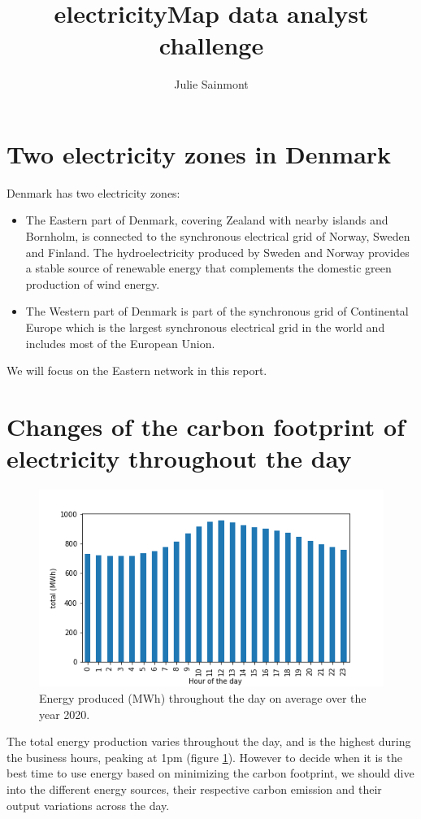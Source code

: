 \documentclass[11pt]{article} %
\title{electricityMap data analyst challenge}
\author{Julie Sainmont}
\begin{document}
\maketitle

\section{Two electricity zones in Denmark}

Denmark has two electricity zones:
\begin{itemize}
\item The Eastern part of Denmark, covering Zealand with nearby islands and Bornholm, is connected to the synchronous electrical grid of Norway, Sweden and Finland. The hydroelectricity produced by Sweden and Norway provides a stable source of renewable energy that complements the domestic green production of wind energy.
\item The Western part of Denmark is part of the synchronous grid of Continental Europe which is the largest  synchronous electrical grid in the world and includes most of the European Union.
\end{itemize}
We will focus on the Eastern network in this report.

\section{Changes of the carbon footprint of electricity throughout the day}

\begin{figure}[h!]
  \includegraphics[width=0.8\linewidth]{../outputs/total.png}
  \caption{Energy produced (MWh) throughout the day on average over the year 2020.}
  \label{fig:total_kwh}
\end{figure}
The total energy production varies throughout the day, and is the highest during the business hours, peaking at 1pm (figure \ref{fig:total_kwh}). However to decide when it is the best time to use energy based on minimizing the carbon footprint, we should dive into the different energy sources, their respective carbon emission and their output variations across the day.\\
\end{document}

